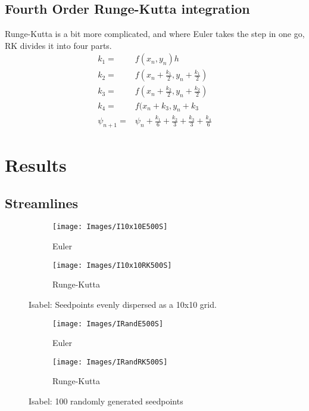 \documentclass[11pt,a4paper,english]{article}
\numberwithin{equation}{section}
\begin{document}
\subsection{Fourth Order Runge-Kutta integration}
Runge-Kutta is a bit more complicated, and where Euler takes the step in one go, RK divides it into four parts.
\begin{align*}
	k_1 =& f(x_n, y_n)h	\\
	k_2 =& f(x_n + \frac{k_1}{2}, y_n + \frac{k_1}{2})	\\
	k_3 =& f(x_n + \frac{k_2}{2}, y_n + \frac{k_2}{2})	\\
	k_4 =& f(x_n + k_3, y_n + k_3	\\	
	\psi_{n+1} =& \psi_n + \frac{k_1}{6} + \frac{k_2}{3} + \frac{k_3}{3} + \frac{k_4}{6}
\end{align*}

\newpage
\section{Results}

\subsection{Streamlines}
\begin{figure}[ht]
	\centering
	\hspace*{-1.5cm}
	\begin{subfigure}{.6\textwidth}
		\centering
		\texttt{[image: Images/I10x10E500S]}
		\caption{Euler}
		\label{fig:sub1}
	\end{subfigure}%
	\begin{subfigure}{.6\textwidth}
		\centering
		\texttt{[image: Images/I10x10RK500S]}
		\caption{Runge-Kutta}
		\label{fig:sub2}
	\end{subfigure}
	\caption{Isabel: Seedpoints evenly dispersed as a 10x10 grid.}
	\label{fig:test}
\end{figure}

\begin{figure}[ht]
	\centering
	\hspace*{-1.5cm}
	\begin{subfigure}{.6\textwidth}
		\centering
		\texttt{[image: Images/IRandE500S]}
		\caption{Euler}
		\label{fig:sub1}
	\end{subfigure}%
	\begin{subfigure}{.6\textwidth}
		\centering
		\texttt{[image: Images/IRandRK500S]}
		\caption{Runge-Kutta}
		\label{fig:sub2}
	\end{subfigure}
	\caption{Isabel: 100 randomly generated seedpoints}
	\label{fig:test}
\end{figure}
\end{document}
